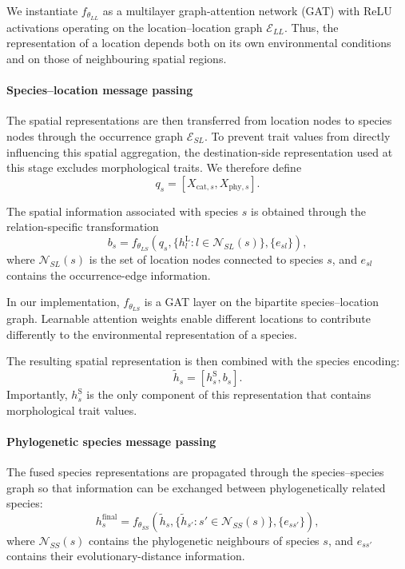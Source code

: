 \documentclass[preprint,12pt,authoryear]{elsarticle}
\begin{document}
We instantiate \(f_{\theta_{LL}}\) as a multilayer graph-attention network (GAT) with ReLU activations operating on the location--location graph \(\mathcal{E}_{LL}\). Thus, the representation of a location depends both on its own environmental conditions and on those of neighbouring spatial regions.

\paragraph{Species--location message passing}

The spatial representations are then transferred from location nodes to species nodes through the occurrence graph \(\mathcal{E}_{SL}\). To prevent trait values from directly influencing this spatial aggregation, the destination-side representation used at this stage excludes morphological traits. We therefore define
\begin{equation}
    q_s=[X_{\mathrm{cat},s},X_{\mathrm{phy},s}].
\end{equation}

The spatial information associated with species \(s\) is obtained through the relation-specific transformation
\begin{equation}
    b_s
    =
    f_{\theta_{LS}}
    \left(
        q_s,
        \{h_l^{\mathrm{L}}:
        l\in\mathcal{N}_{SL}(s)\},
        \{e_{sl}\}
    \right),
\end{equation}
where \(\mathcal{N}_{SL}(s)\) is the set of location nodes connected to species \(s\), and \(e_{sl}\) contains the occurrence-edge information.

In our implementation,
\(f_{\theta_{LS}}\)
is a GAT layer on the bipartite species--location graph. Learnable attention weights enable different locations to contribute differently to the environmental representation of a species.

The resulting spatial representation is then combined with the species encoding:
\begin{equation}
    \tilde h_s
    =
    [h_s^{\mathrm{S}},b_s].
\end{equation}
Importantly, \(h_s^{\mathrm{S}}\) is the only component of this representation that contains morphological trait values.

\paragraph{Phylogenetic species message passing}

The fused species representations are propagated through the species--species graph so that information can be exchanged between phylogenetically related species:
\begin{equation}
    h_s^{\mathrm{final}}
    =
    f_{\theta_{SS}}
    \left(
        \tilde h_s,
        \{\tilde h_{s'}:
        s'\in\mathcal{N}_{SS}(s)\},
        \{e_{ss'}\}
    \right),
\end{equation}
where \(\mathcal{N}_{SS}(s)\) contains the phylogenetic neighbours of species \(s\), and \(e_{ss'}\) contains their evolutionary-distance information.
\end{document}
